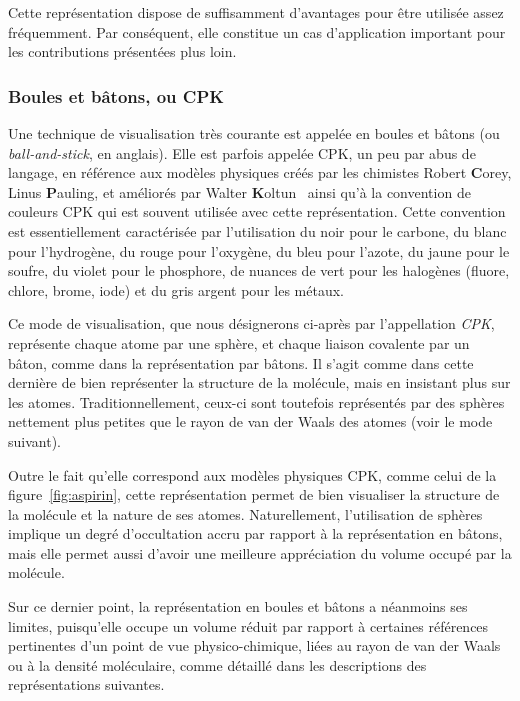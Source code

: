 	Cette représentation dispose de suffisamment d'avantages pour être utilisée assez fréquemment. Par conséquent, elle constitue un cas d'application important pour les contributions présentées plus loin.
		
	\subsubsection{Boules et bâtons, ou CPK} Une technique de visualisation très courante est appelée \og en boules et bâtons \fg{} (ou \emph{ball-and-stick}, en anglais). Elle est parfois appelée CPK, un peu par abus de langage, en référence aux modèles physiques créés par les chimistes Robert \textbf{C}orey, Linus \textbf{P}auling, et améliorés par Walter \textbf{K}oltun~\cite{corey1953molecular, koltun1965space} ainsi qu'à la convention de couleurs CPK qui est souvent utilisée avec cette représentation. Cette convention est essentiellement caractérisée par l'utilisation du noir pour le carbone, du blanc pour l'hydrogène, du rouge pour l'oxygène, du bleu pour l'azote, du jaune pour le soufre, du violet pour le phosphore, de nuances de vert pour les halogènes (fluore, chlore, brome, iode) et du gris argent pour les métaux.
		
	Ce mode de visualisation, que nous désignerons ci-après par l'appellation \emph{CPK}, représente chaque atome par une sphère, et chaque liaison covalente par un bâton, comme dans la représentation par bâtons. Il s'agit comme dans cette dernière de bien représenter la structure de la molécule, mais en insistant plus sur les atomes. Traditionnellement, ceux-ci sont toutefois représentés par des sphères nettement plus petites que le rayon de van der Waals des atomes (voir le mode suivant).
		
	Outre le fait qu'elle correspond aux modèles physiques CPK, comme celui de la figure~\ref{fig:aspirin}, cette représentation permet de bien visualiser la structure de la molécule et la nature de ses atomes. Naturellement, l'utilisation de sphères implique un degré d'occultation accru par rapport à la représentation en bâtons, mais elle permet aussi d'avoir une meilleure appréciation du volume occupé par la molécule.
		
	Sur ce dernier point, la représentation en boules et bâtons a néanmoins ses limites, puisqu'elle occupe un volume réduit par rapport à certaines références pertinentes d'un point de vue physico-chimique, liées au rayon de van der Waals ou à la densité moléculaire, comme détaillé dans les descriptions des représentations suivantes.
		
